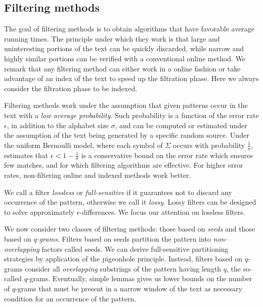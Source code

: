 
\subsection{Filtering methods}
\label{sec:intro:filtering}

The goal of filtering methods is to obtain algorithms that have favorable average running times.
The principle under which they work is that large and uninteresting portions of the text can be quickly discarded, while narrow and highly similar portions can be verified with a conventional online method.
We remark that any filtering method can either work in a online fashion or take advantage of an index of the text to speed up the filtration phase.
Here we always consider the filtration phase to be indexed.

Filtering methods work under the assumption that given patterns occur in the text with a \emph{low average probability}.
Such probability is a function of the error rate $\epsilon$, in addition to the alphabet size $\sigma$, and can be computed or estimated under the assumption of the text being generated by a specific random source.
Under the uniform Bernoulli model, where each symbol of $\Sigma$ occurs with probability $\frac{1}{\sigma}$, \citet{Navarro2000} estimates that $\epsilon < 1 - \frac{1}{\sigma}$ is a conservative bound on the error rate which ensures few matches, and for which filtering algorithms are effective.
For higher error rates, non-filtering online and indexed methods work better.

We call a filter \emph{lossless} or \emph{full-sensitive} if it guarantees not to discard any occurrence of the pattern, otherwise we call it \emph{lossy}.
Lossy filters can be designed to solve approximately $\epsilon$-differences.
We focus our attention on lossless filters. 

We now consider two classes of filtering methods: those based on \emph{seeds} and those based on \emph{$q$-grams}.
Filters based on seeds partition the pattern into \emph{non-overlapping} factors called seeds.
We can derive full-sensitive partitioning strategies by application of the pigeonhole principle.
Instead, filters based on $q$-grams consider all \emph{overlapping} substrings of the pattern having length $q$, the so-called $q$-grams.
Eventually, simple lemmas gives us lower bounds on the number of $q$-grams that must be present in a narrow window of the text as necessary condition for an occurrence of the pattern.

